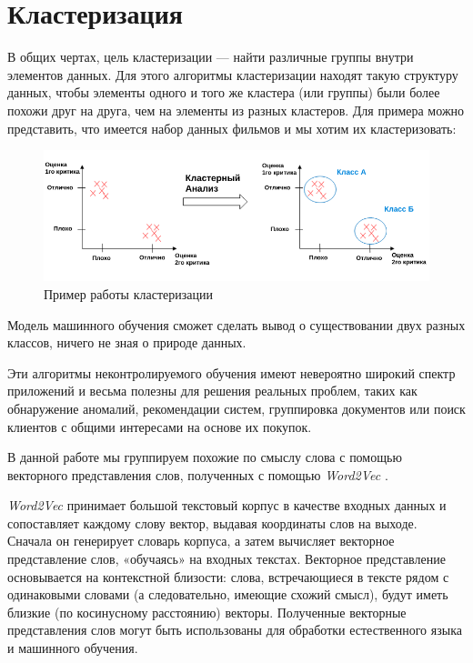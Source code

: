 \section{Кластеризация}

В общих чертах, цель кластеризации --- найти различные группы внутри элементов данных. Для этого алгоритмы кластеризации находят такую структуру данных, чтобы элементы одного и того же кластера (или группы) были более похожи друг на друга, чем на элементы из разных кластеров. Для примера можно представить, что имеется набор данных фильмов и мы
хотим их кластеризовать:


\begin{figure}[H]
\centering
\includegraphics[scale=0.6]{pics/clustering.png}
\caption{Пример работы кластеризации}
\end{figure}


Модель машинного обучения сможет сделать вывод о существовании двух разных классов, ничего не зная о природе данных.

Эти алгоритмы неконтролируемого обучения имеют невероятно широкий спектр приложений и весьма полезны для решения реальных проблем, таких как обнаружение аномалий, рекомендации систем, группировка документов или поиск клиентов с общими интересами на основе их покупок.

В данной работе мы группируем похожие по смыслу слова с помощью векторного представления слов, полученных с помощью \textit{Word2Vec} \cite{bib5}. 

\textit{Word2Vec} принимает большой текстовый корпус в качестве входных данных и сопоставляет каждому слову вектор, выдавая координаты слов на выходе. Сначала он генерирует словарь корпуса, а затем вычисляет векторное представление слов, «обучаясь» на входных текстах. Векторное представление основывается на контекстной близости: слова, встречающиеся в тексте рядом с одинаковыми словами (а следовательно, имеющие схожий смысл), будут иметь близкие (по косинусному расстоянию) векторы. Полученные векторные представления слов могут быть использованы для обработки естественного языка и машинного обучения.
